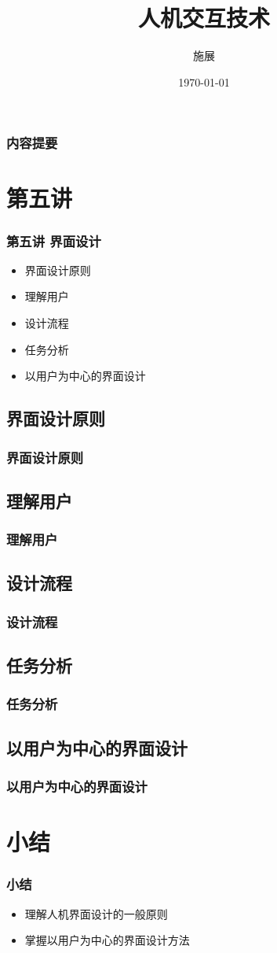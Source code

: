 \documentclass{beamer}
\title{人机交互技术}
\author{施展}
\institute{华中科技大学~武汉光电国家实验室}
\date{\today}
\begin{document}
\begin{frame}
	\frametitle{内容提要}
	\titlepage
\end{frame}

\begin{frame}
	\tableofcontents
\end{frame}

\section{第五讲}
\begin{frame}
	\frametitle{第五讲 界面设计}
	\begin{itemize}
		\item 界面设计原则
		\item 理解用户
		\item 设计流程
		\item 任务分析
		\item 以用户为中心的界面设计
	\end{itemize}
\end{frame}

\subsection{界面设计原则}
\begin{frame}
	\frametitle{界面设计原则}

\end{frame}

\subsection{理解用户}
\begin{frame}
	\frametitle{理解用户}

\end{frame}

\subsection{设计流程}
\begin{frame}
	\frametitle{设计流程}

\end{frame}

\subsection{任务分析}
\begin{frame}
	\frametitle{任务分析}

\end{frame}

\subsection{以用户为中心的界面设计}
\begin{frame}
	\frametitle{以用户为中心的界面设计}

\end{frame}

\section{小结}
\begin{frame}
	\frametitle{小结}
	\begin{itemize}
		\item 理解人机界面设计的一般原则
		\item 掌握以用户为中心的界面设计方法
	\end{itemize}
\end{frame}
\end{document}
